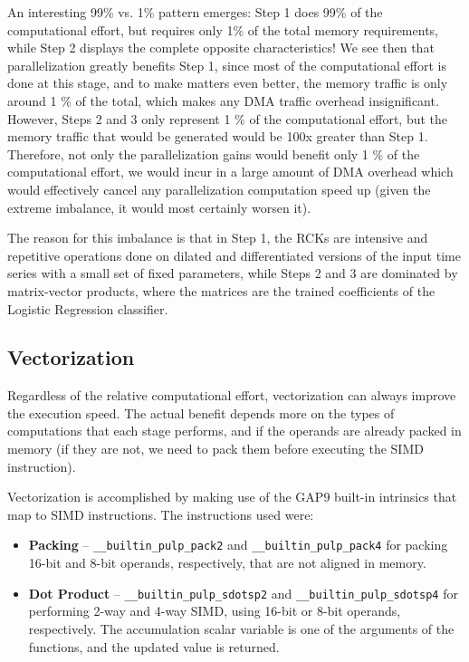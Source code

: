         An interesting 99\% vs. 1\% pattern emerges: Step 1 does 99\% of the computational effort, but requires only 1\% of the total memory requirements, while Step 2 displays the complete opposite characteristics! We see then
        that parallelization greatly benefits Step 1, since most of the computational effort is done at this stage, and to make matters even better, the memory traffic is only around 1 \% of the total, which makes any DMA
        traffic overhead insignificant. However, Steps 2 and 3 only represent 1 \% of the computational effort, but the memory traffic that would be generated would be 100x greater than Step 1. Therefore, not only the parallelization
        gains would benefit only 1 \% of the computational effort, we would incur in a large amount of DMA overhead which would effectively cancel any parallelization computation speed up (given the extreme imbalance, it would most certainly worsen it).

        The reason for this imbalance is that in Step 1, the RCKs are intensive and repetitive operations done on dilated and differentiated versions of the input time series with a small set of fixed parameters, while Steps 2 and 3 are dominated by 
        matrix-vector products, where the matrices are the trained coefficients of the Logistic Regression classifier.

        \subsection{Vectorization}\label{sec:im_nanohydra_embimp_vect}

        Regardless of the relative computational effort, vectorization can always improve the execution speed. 
        The actual benefit depends more on the types of computations that each stage performs, and if the operands are already packed in memory (if they are not, we need to pack them before executing the SIMD instruction).

        Vectorization is accomplished by making use of the GAP9 built-in intrinsics that map to SIMD instructions. The instructions used were:

        \begin{itemize}
            \item \textbf{Packing}     -- \verb|__builtin_pulp_pack2| and \verb|__builtin_pulp_pack4| for packing 16-bit and 8-bit operands, respectively, that are not aligned in memory.
            \item \textbf{Dot Product} -- \verb|__builtin_pulp_sdotsp2| and \verb|__builtin_pulp_sdotsp4| for performing 2-way and 4-way SIMD, using 16-bit or 8-bit operands, respectively. 
                                          The accumulation scalar variable is one of the arguments of the functions, and the updated value is returned.
        \end{itemize}

